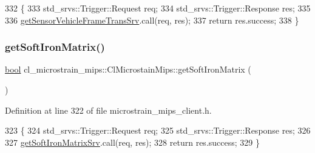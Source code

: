 \begin{DoxyCode}
332     \{
333         std\_srvs::Trigger::Request req;
334         std\_srvs::Trigger::Response res;
335 
336         \hyperlink{classcl__microstrain__mips_1_1ClMicrostainMips_abeafc4f48f26ddd264e61b6cf97c779f}{getSensorVehicleFrameTransSrv}.call(req, res);
337         \textcolor{keywordflow}{return} res.success;
338     \}
\end{DoxyCode}
\mbox{\label{classcl__microstrain__mips_1_1ClMicrostainMips_ad605051aea5b2fe25de85314deb1aa39}} 
\subsubsection{\texorpdfstring{get\+Soft\+Iron\+Matrix()}{getSoftIronMatrix()}}
{\footnotesize\ttfamily \hyperlink{classbool}{bool} cl\+\_\+microstrain\+\_\+mips\+::\+Cl\+Microstain\+Mips\+::get\+Soft\+Iron\+Matrix (\begin{DoxyParamCaption}{ }\end{DoxyParamCaption})\hspace{0.3cm}{\ttfamily [inline]}}



Definition at line 322 of file microstrain\+\_\+mips\+\_\+client.\+h.


\begin{DoxyCode}
323     \{
324         std\_srvs::Trigger::Request req;
325         std\_srvs::Trigger::Response res;
326 
327         \hyperlink{classcl__microstrain__mips_1_1ClMicrostainMips_a7210454a851669073d06d82511014ecc}{getSoftIronMatrixSrv}.call(req, res);
328         \textcolor{keywordflow}{return} res.success;
329     \}
\end{DoxyCode}
\mbox{\label{classcl__microstrain__mips_1_1ClMicrostainMips_afca57a1888e4e57f6dba69083e53442d}} 
